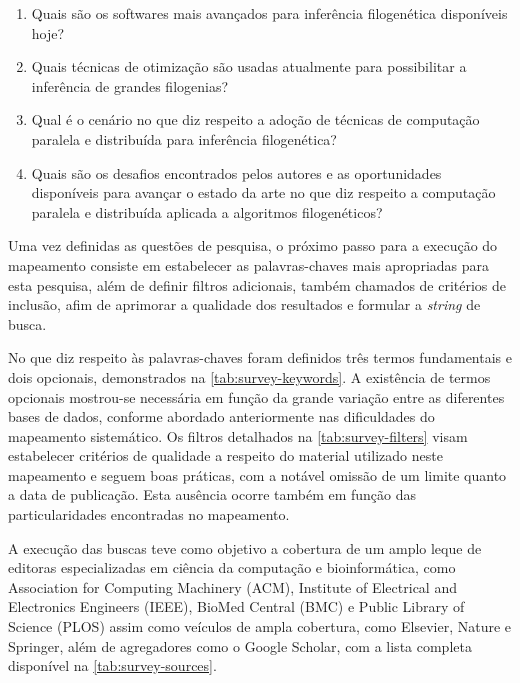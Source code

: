 \documentclass[english,brazilian]{UNISINOSmonografia} %
\begin{document}
\begin{enumerate}[label=Questão~\arabic*:,itemindent=*]
	
	\item Quais são os softwares mais avançados para inferência filogenética disponíveis hoje?
	
	\item Quais técnicas de otimização são usadas atualmente para possibilitar a inferência de grandes filogenias?
	
	\item Qual é o cenário no que diz respeito a adoção de técnicas de computação paralela e distribuída para inferência filogenética?
	
	\item Quais são os desafios encontrados pelos autores e as oportunidades disponíveis para avançar o estado da arte no que diz respeito a computação paralela e distribuída aplicada a algoritmos filogenéticos?
	
\end{enumerate}


Uma vez definidas as questões de pesquisa, o próximo passo para a execução do mapeamento consiste em estabelecer as palavras-chaves mais apropriadas para esta pesquisa, além de definir filtros adicionais, também chamados de critérios de inclusão, afim de aprimorar a qualidade dos resultados e formular a \textit{string} de busca.


No que diz respeito às palavras-chaves foram definidos três termos fundamentais e dois opcionais, demonstrados na \autoref{tab:survey-keywords}.
A existência de termos opcionais mostrou-se necessária em função da grande variação entre as diferentes bases de dados, conforme abordado anteriormente nas dificuldades do mapeamento sistemático.
Os filtros detalhados na \autoref{tab:survey-filters} visam estabelecer critérios de qualidade a respeito do material utilizado neste mapeamento e seguem boas práticas, com a notável omissão de um limite quanto a data de publicação.
Esta ausência ocorre também em função das particularidades encontradas no mapeamento.




A execução das buscas teve como objetivo a cobertura de um amplo leque de editoras especializadas em ciência da computação e bioinformática, como Association for Computing Machinery (ACM), Institute of Electrical and Electronics Engineers (IEEE), BioMed Central (BMC) e Public Library of Science (PLOS) assim como veículos de ampla cobertura, como Elsevier, Nature e Springer, além de agregadores como o Google Scholar, com a lista completa disponível na \autoref{tab:survey-sources}.
\end{document}
